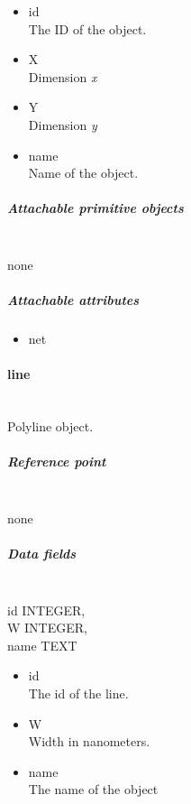 \documentclass[12pt]{article}
\begin{document}
\begin{itemize}
\item
  id\\The ID of the object.
\item
  X\\Dimension \emph{x}
\item
  Y\\Dimension \emph{y}
\item
  name\\Name of the object.
\end{itemize}

\subparagraph{Attachable primitive
objects}\label{attachable-primitive-objects-2}

\mbox{}\\

none

\subparagraph{Attachable attributes}\label{attachable-attributes-2}

\begin{itemize}
\itemsep1pt\parskip0pt
\item
  net
\end{itemize}

\paragraph{line}\label{line}

\mbox{}\\

Polyline object.

\subparagraph{Reference point}\label{reference-point-3}

\mbox{}\\

none

\subparagraph{Data fields}\label{data-fields-3}

\mbox{}\\

id INTEGER,\\W INTEGER,\\name TEXT

\begin{itemize}
\item
  id\\The id of the line.
\item
  W\\Width in nanometers.
\item
  name\\The name of the object
\end{itemize}
\end{document}
